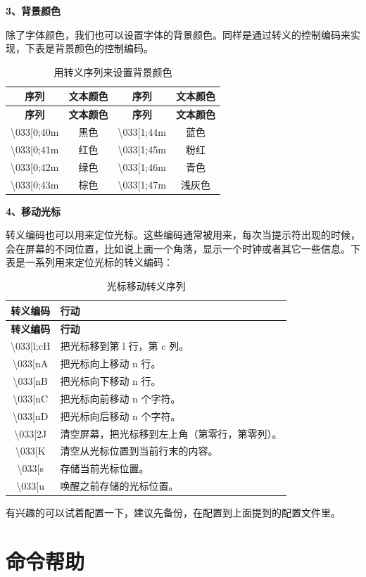 \documentclass[doctor,openright,twoside]{sjtuthesis}
\theoremstyle{plain}
\theoremstyle{definition}
\theoremstyle{remark}
\theoremstyle{ocrenumbox}
\theoremstyle{plain}
\begin{document}
\textbf{3、背景颜色}

除了字体颜色，我们也可以设置字体的背景颜色。同样是通过转义的控制编码来实现，下表是背景颜色的控制编码。

\begin{longtable}[]{@{}cccc@{}}
\caption{用转义序列来设置背景颜色}\tabularnewline
\toprule
\textbf{序列} & \textbf{文本颜色} & \textbf{序列} & \textbf{文本颜色}\tabularnewline
\midrule
\endfirsthead
\toprule
\textbf{序列} & \textbf{文本颜色} & \textbf{序列} & \textbf{文本颜色}\tabularnewline
\midrule
\endhead
\textbackslash033{[}0;40m & 黑色 & \textbackslash033{[}1;44m & 蓝色\tabularnewline
\textbackslash033{[}0;41m & 红色 & \textbackslash033{[}1;45m & 粉红\tabularnewline
\textbackslash033{[}0;42m & 绿色 & \textbackslash033{[}1;46m & 青色\tabularnewline
\textbackslash033{[}0;43m & 棕色 & \textbackslash033{[}1;47m & 浅灰色\tabularnewline
\bottomrule
\end{longtable}

\textbf{4、移动光标}

转义编码也可以用来定位光标。这些编码通常被用来，每次当提示符出现的时候，会在屏幕的不同位置，比如说上面一个角落，显示一个时钟或者其它一些信息。下表是一系列用来定位光标的转义编码：

\begin{longtable}[]{@{}cl@{}}
\caption{光标移动转义序列}\tabularnewline
\toprule
\textbf{转义编码} & \textbf{行动}\tabularnewline
\midrule
\endfirsthead
\toprule
\textbf{转义编码} & \textbf{行动}\tabularnewline
\midrule
\endhead
\textbackslash033{[}l;cH & 把光标移到第 l 行，第 c 列。\tabularnewline
\textbackslash033{[}nA & 把光标向上移动 n 行。\tabularnewline
\textbackslash033{[}nB & 把光标向下移动 n 行。\tabularnewline
\textbackslash033{[}nC & 把光标向前移动 n 个字符。\tabularnewline
\textbackslash033{[}nD & 把光标向后移动 n 个字符。\tabularnewline
\textbackslash033{[}2J & 清空屏幕，把光标移到左上角（第零行，第零列）。\tabularnewline
\textbackslash033{[}K & 清空从光标位置到当前行末的内容。\tabularnewline
\textbackslash033{[}s & 存储当前光标位置。\tabularnewline
\textbackslash033{[}u & 唤醒之前存储的光标位置。\tabularnewline
\bottomrule
\end{longtable}

有兴趣的可以试着配置一下，建议先备份，在配置到上面提到的配置文件里。

\hypertarget{section-56}{%
\section{命令帮助}\label{section-56}}
\end{document}

